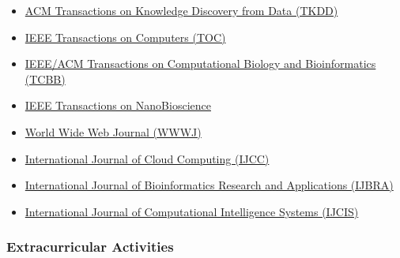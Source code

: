 \documentclass[10pt,a4paper]{article}
\begin{document}
\begin{itemize}
\itemsep1pt\parskip0pt
\item
  \href{http://tkdd.acm.org/}{ACM Transactions on Knowledge Discovery
  from Data (TKDD)}
\item
  \href{http://www.computer.org/portal/web/tc}{IEEE Transactions on
  Computers (TOC)}
\item
  \href{http://www.computer.org/portal/web/tcbb}{IEEE/ACM Transactions
  on Computational Biology and Bioinformatics (TCBB)}
\item
  \href{http://ieeexplore.ieee.org/xpl/RecentIssue.jsp?punumber=7728}{IEEE
  Transactions on NanoBioscience}
\item
  \href{http://www.editorialmanager.com/wwwj/}{World Wide Web Journal
  (WWWJ)}
\item
  \href{http://www.inderscience.com/jhome.php?jcode=ijcc}{International
  Journal of Cloud Computing (IJCC)}
\item
  \href{http://www.inderscience.com/jhome.php?jcode=ijbra}{International
  Journal of Bioinformatics Research and Applications (IJBRA)}
\item
  \href{http://www.atlantis-press.com/publications/ijcis/}{International
  Journal of Computational Intelligence Systems (IJCIS)}
\end{itemize}

\subsubsection{Extracurricular
Activities}\label{extracurricular-activities}

\renewenvironment{description}{
  \begin{basedescript}{\desclabelstyle{\pushlabel}\desclabelwidth{4em}}
}{
  \end{basedescript}
}
\end{document}
